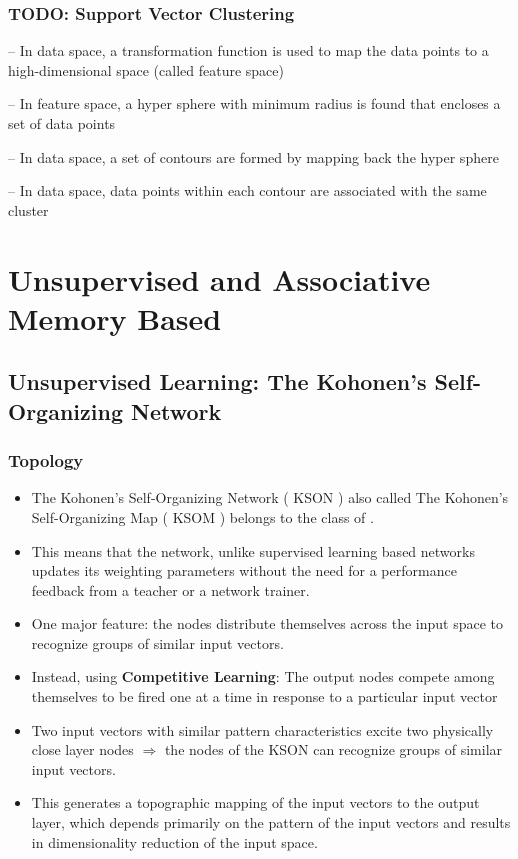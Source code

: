 \documentclass{tron}
\begin{document}
\subsubsection{TODO: Support Vector Clustering} 
\begin{remark}{}
– In data space, a transformation function is used to map the data points to a high-dimensional space (called feature space)

– In feature space, a hyper sphere with minimum radius is found that encloses a set of data points

– In data space, a set of contours are formed by mapping back the hyper sphere

– In data space, data points within each contour are associated with the same cluster
\end{remark}



\newpage
\section{Unsupervised and Associative Memory Based}
\subsection{Unsupervised Learning: The Kohonen's Self-Organizing Network}
\subsubsection{Topology}
	\begin{itemize}
		\item The Kohonen’s Self-Organizing Network ( KSON ) also called The Kohonen’s Self-Organizing Map ( KSOM ) belongs to the class of .
		\item This means that the network, unlike supervised learning based networks updates its weighting parameters without the need for a performance feedback from a teacher or a network trainer.
		\item One major feature: the nodes distribute themselves across the input space to recognize groups of similar input vectors.
		\item Instead, using \textbf{Competitive Learning}: The output nodes compete among themselves to be fired one at a time in response to a particular input vector
		\item Two input vectors with similar pattern characteristics excite two physically close layer nodes $\Rightarrow$ the nodes of the KSON can recognize groups of similar input vectors.
		\item This generates a topographic mapping of the input vectors to the output layer, which depends primarily on the pattern of the input vectors and results in dimensionality reduction of the input space.
	\end{itemize}
	
\end{document}
